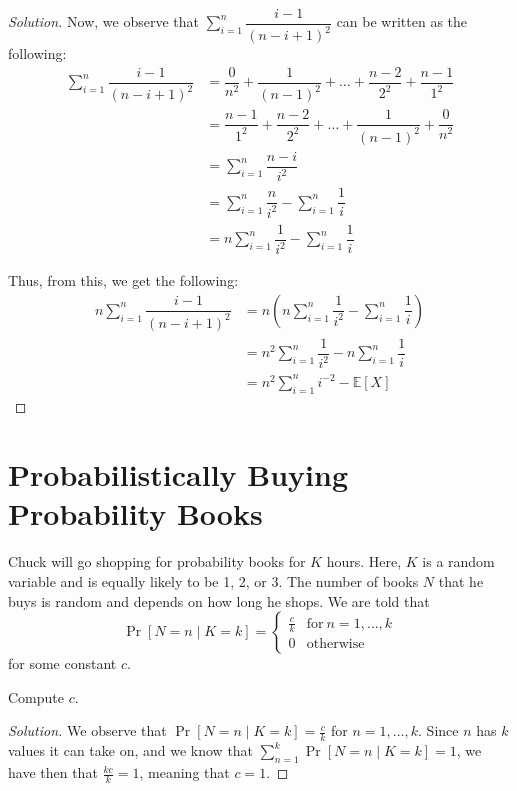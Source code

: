 \documentclass{article}
\newenvironment{solution}{\begin{proof}[Solution]}{\end{proof}}
\newcommand{\E}{\mathbb{E}}
\let\oldsum\sum
\renewcommand{\sum}[2]{\oldsum\limits_{#1}^{#2}}
\begin{document}
\begin{solution}
	Now, we observe that $\sum{i=1}{n} \dfrac{i-1}{(n-i+1)^{2}}$ can be written as the following:
	\begin{align*}
		\sum{i=1}{n} \dfrac{i-1}{(n-i+1)^{2}} &= \dfrac{0}{n^{2}} + \dfrac{1}{(n-1)^{2}} + \ldots + \dfrac{n-2}{2^{2}} + \dfrac{n-1}{1^{2}} \\
		&= \dfrac{n-1}{1^{2}} +  \dfrac{n-2}{2^{2}} + \ldots + \dfrac{1}{(n-1)^{2}} + \dfrac{0}{n^{2}} \\
		&= \sum{i=1}{n} \dfrac{n-i}{i^{2}} \\
		&= \sum{i=1}{n} \dfrac{n}{i^{2}} - \sum{i=1}{n} \dfrac{1}{i} \\
		&= n\sum{i=1}{n} \dfrac{1}{i^{2}} - \sum{i=1}{n} \dfrac{1}{i}
	\end{align*}

	Thus, from this, we get the following:
	\begin{align*}
		n\sum{i=1}{n} \dfrac{i-1}{(n-i+1)^{2}} &= n\left( n\sum{i=1}{n} \dfrac{1}{i^{2}} - \sum{i=1}{n} \dfrac{1}{i} \right) \\
		&= n^{2}\sum{i=1}{n} \dfrac{1}{i^{2}} - n\sum{i=1}{n} \dfrac{1}{i} \\
		&= n^{2}\sum{i=1}{n} i^{-2} - \E[X]
	\end{align*}
\end{solution}

\newpage

\section{Probabilistically Buying Probability Books}
Chuck will go shopping for probability books for $K$ hours. Here, $K$
is a random variable and is equally likely to be 1, 2, or 3. The
number of books $N$ that he buys is random and depends on how long he shops. We are told that
\[
\Pr[N = n \mid K = k] =
\begin{cases}
	\frac{c}{k} & \text{for}\ n=1,\ldots,k \\
	0 & \text{otherwise}
\end{cases}
\]
for some constant $c$.

\begin{hw}
	Compute $c$.
\end{hw}
\begin{solution}
	We observe that $\Pr[N = n \mid K = k] = \frac{c}{k}$ for $n = 1, \ldots, k$. Since $n$ has $k$ values it can take on, and we know that $\sum{n=1}{k} \Pr[N=n \mid K = k] = 1$, we have then that $\frac{kc}{k} = 1$, meaning that $c = 1$.
\end{solution}
\end{document}
